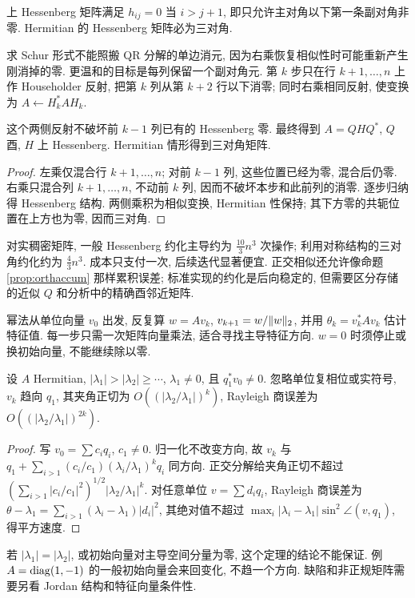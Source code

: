\begin{definition}
上 Hessenberg 矩阵满足 $h_{ij}=0$ 当 $i>j+1$, 即只允许主对角以下第一条副对角非零. Hermitian 的 Hessenberg 矩阵必为三对角.
\end{definition}
求 Schur 形式不能照搬 QR 分解的单边消元, 因为右乘恢复相似性时可能重新产生刚消掉的零. 更温和的目标是每列保留一个副对角元. 第 $k$ 步只在行 $k+1,\ldots,n$ 上作 Householder 反射, 把第 $k$ 列从第 $k+2$ 行以下消零; 同时右乘相同反射, 使变换为 $A\leftarrow H_k^*AH_k$.

\begin{proposition}
这个两侧反射不破坏前 $k-1$ 列已有的 Hessenberg 零. 最终得到 $A=QHQ^*$, $Q$ 酉, $H$ 上 Hessenberg. Hermitian 情形得到三对角矩阵.
\end{proposition}
\begin{proof}
左乘仅混合行 $k+1,\ldots,n$; 对前 $k-1$ 列, 这些位置已经为零, 混合后仍零. 右乘只混合列 $k+1,\ldots,n$, 不动前 $k$ 列, 因而不破坏本步和此前列的消零. 逐步归纳得 Hessenberg 结构. 两侧乘积为相似变换, Hermitian 性保持; 其下方零的共轭位置在上方也为零, 因而三对角.
\end{proof}
对实稠密矩阵, 一般 Hessenberg 约化主导约为 $\tfrac{10}{3}n^3$ 次操作; 利用对称结构的三对角约化约为 $\tfrac43n^3$. 成本只支付一次, 后续迭代显著便宜. 正交相似还允许像命题 \ref{prop:orthaccum} 那样累积误差; 标准实现的约化是后向稳定的, 但需要区分存储的近似 $Q$ 和分析中的精确酉邻近矩阵.

幂法从单位向量 $v_0$ 出发, 反复算 $w=Av_k$, $v_{k+1}=w/\lVert w\rVert_2$, 并用 $\theta_k=v_k^*Av_k$ 估计特征值. 每一步只需一次矩阵向量乘法, 适合寻找主导特征方向. $w=0$ 时须停止或换初始向量, 不能继续除以零.

\begin{theorem}\label{thm:power}
设 $A$ Hermitian, $|\lambda_1|>|\lambda_2|\ge\cdots$, $\lambda_1\ne0$, 且 $q_1^*v_0\ne0$. 忽略单位复相位或实符号, $v_k$ 趋向 $q_1$, 其夹角正切为 $O((|\lambda_2/\lambda_1|)^k)$, Rayleigh 商误差为 $O((|\lambda_2/\lambda_1|)^{2k})$.
\end{theorem}
\begin{proof}
写 $v_0=\sum c_iq_i$, $c_1\ne0$. 归一化不改变方向, 故 $v_k$ 与
$q_1+\sum_{i>1}(c_i/c_1)(\lambda_i/\lambda_1)^kq_i$ 同方向. 正交分解给夹角正切不超过
$(\sum_{i>1}|c_i/c_1|^2)^{1/2}|\lambda_2/\lambda_1|^k$.
对任意单位 $v=\sum d_iq_i$, Rayleigh 商误差为
$\theta-\lambda_1=\sum_{i>1}(\lambda_i-\lambda_1)|d_i|^2$,
其绝对值不超过 $\max_i|\lambda_i-\lambda_1|\sin^2\angle(v,q_1)$, 得平方速度.
\end{proof}
若 $|\lambda_1|=|\lambda_2|$, 或初始向量对主导空间分量为零, 这个定理的结论不能保证. 例 $A=\operatorname{diag}(1,-1)$ 的一般初始向量会来回变化, 不趋一个方向. 缺陷和非正规矩阵需要另看 Jordan 结构和特征向量条件性.

